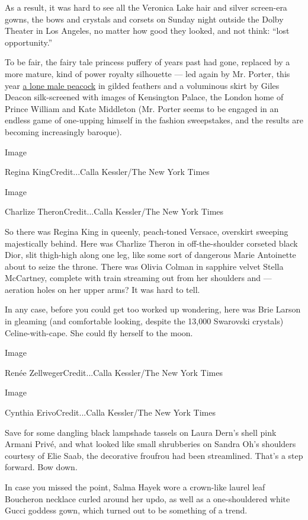 As a result, it was hard to see all the Veronica Lake hair and silver
screen-era gowns, the bows and crystals and corsets on Sunday night
outside the Dolby Theater in Los Angeles, no matter how good they
looked, and not think: ``lost opportunity.''

To be fair, the fairy tale princess puffery of years past had gone,
replaced by a more mature, kind of power royalty silhouette --- led
again by Mr. Porter, this year
\href{https://www.nytimes.com/2020/02/09/fashion/billy-porter-oscars-royal-kensington.html}{a
lone male peacock} in gilded feathers and a voluminous skirt by Giles
Deacon silk-screened with images of Kensington Palace, the London home
of Prince William and Kate Middleton (Mr. Porter seems to be engaged in
an endless game of one-upping himself in the fashion sweepstakes, and
the results are becoming increasingly baroque).

Image

Regina KingCredit...Calla Kessler/The New York Times

Image

Charlize TheronCredit...Calla Kessler/The New York Times

So there was Regina King in queenly, peach-toned Versace, overskirt
sweeping majestically behind. Here was Charlize Theron in
off-the-shoulder corseted black Dior, slit thigh-high along one leg,
like some sort of dangerous Marie Antoinette about to seize the throne.
There was Olivia Colman in sapphire velvet Stella McCartney, complete
with train streaming out from her shoulders and --- aeration holes on
her upper arms? It was hard to tell.

In any case, before you could get too worked up wondering, here was Brie
Larson in gleaming (and comfortable looking, despite the 13,000
Swarovski crystals) Celine-with-cape. She could fly herself to the moon.

Image

Renée ZellwegerCredit...Calla Kessler/The New York Times

Image

Cynthia ErivoCredit...Calla Kessler/The New York Times

Save for some dangling black lampshade tassels on Laura Dern's shell
pink Armani Privé, and what looked like small shrubberies on Sandra Oh's
shoulders courtesy of Elie Saab, the decorative froufrou had been
streamlined. That's a step forward. Bow down.

In case you missed the point, Salma Hayek wore a crown-like laurel leaf
Boucheron necklace curled around her updo, as well as a one-shouldered
white Gucci goddess gown, which turned out to be something of a trend.


